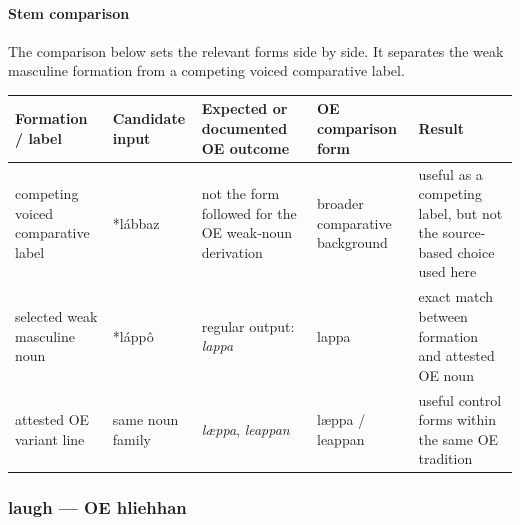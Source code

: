 \documentclass[
  british,
  a4paper,
]{article}
\newcounter{none} %
\begin{document}
\paragraph{Stem comparison}\label{stem-comparison-2}

The comparison below sets the relevant forms side by side. It separates
the weak masculine formation from a competing voiced comparative label.

{\def\LTcaptype{none} %
\begin{longtable}[]{@{}
  >{\raggedright\arraybackslash}p{}
  >{\raggedright\arraybackslash}p{}
  >{\raggedright\arraybackslash}p{}
  >{\raggedright\arraybackslash}p{}
  >{\raggedright\arraybackslash}p{}@{}}
\toprule\noalign{}
\begin{minipage}[b]{\linewidth}\raggedright
Formation / label
\end{minipage} & \begin{minipage}[b]{\linewidth}\raggedright
Candidate input
\end{minipage} & \begin{minipage}[b]{\linewidth}\raggedright
Expected or documented OE outcome
\end{minipage} & \begin{minipage}[b]{\linewidth}\raggedright
OE comparison form
\end{minipage} & \begin{minipage}[b]{\linewidth}\raggedright
Result
\end{minipage} \\
\midrule\noalign{}
\endhead
\bottomrule\noalign{}
\endlastfoot
competing voiced comparative label & *lábbaz & not the form followed for
the OE weak-noun derivation & broader comparative background & useful as
a competing label, but not the source-based choice used here \\
selected weak masculine noun & *láppô & regular output: \emph{lappa} &
lappa & exact match between formation and attested OE noun \\
attested OE variant line & same noun family & \emph{læppa},
\emph{leappan} & læppa / leappan & useful control forms within the same
OE tradition \\
\end{longtable}
}

\subsubsection{laugh --- OE hliehhan}\label{laugh-oe-hliehhan}
\end{document}
